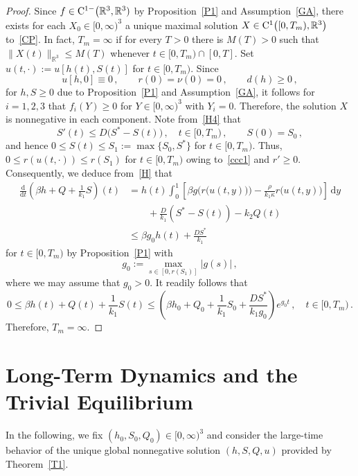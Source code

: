 \documentclass[reqno,11pt]{amsart}
\numberwithin{equation}{section}
\newcommand{\R}{\mathbb{R}}
\newcommand{\rd}{\mathrm{d}}
\begin{document}
\begin{proof} 
 Since \mbox{$f\in {\rm C}^{1-}\big(\R^3,\R^3)$} by Proposition~\ref{P1} and Assumption~\eqref{GA}, there exists for each $X_0\in [0,\infty)^3$  a unique maximal solution $X\in {\rm C}^1\bigl([0,T_m),\R^3\bigr)$ to~\eqref{CP}. In fact,  \mbox{$T_m=\infty$} if for every $T>0$ there is $M(T)>0$ such that  $\|X(t)\|_{\R^3}\le M(T)$ whenever $t\in [0,T_m)\cap [0,T]$. Set $u(t,\cdot):=u[h(t),S(t)]$ for $t\in [0,T_m)$. Since 
$$u[h,0]\equiv 0\,,\qquad r(0)=\nu(0)=0\,,\qquad d(h)\ge 0\,,$$ 
for $h,S\ge 0$ due to Proposition~\ref{P1} and Assumption~\eqref{GA}, it follows for $i=1,2,3$ that $f_i(Y)\ge 0$ for $Y\in [0,\infty)^3$ with $Y_i=0$. Therefore, the solution $X$ is nonnegative in each component. 
Note from~\eqref{H4} that
$$
S'(t)\le D\big(S^*-S(t)\big)\,,\quad t\in [0,T_m)\,,\qquad S(0)=S_0\,,
$$
and hence $0\le S(t)\le S_1:=\max\{S_0,S^*\}$ for $t\in [0,T_m)$. Thus, $0\le r(u(t,\cdot))\le r(S_1)$ for $t\in [0,T_m)$ owing to~\eqref{ccc1} and $r'\ge 0$. Consequently, we deduce from~\eqref{H} that
\begin{align}
\frac{\rd}{\rd t}\left(\beta h+Q+\frac{1}{k_1}S\right)(t)&=h(t)\int_0^1 \left[\beta g\bigl(r\bigl(u(t,y)\bigr)\bigr)-\frac{\rho }{k_1\kappa }  r\bigl(u(t,y)\bigr)\right]\,\rd y\nonumber\\
&\qquad+ \frac{D}{k_1}(S^*-S(t))-k_2Q(t)\label{est}\\
&\le \beta g_0 h(t) + \frac{DS^*}{k_1}\nonumber
\end{align}
for $t\in [0,T_m)$ by Proposition~\ref{P1} with 
$$
g_0:=\max_{s\in [0,r(S_1)]} \vert g(s)\vert \,,
$$
where we may assume that $g_0>0$. It readily follows that
$$
0\le \beta h(t)+Q(t)+\frac{1}{k_1}S(t)\le \left(\beta h_0+Q_0+\frac{1}{k_1}S_0+\frac{DS^*}{k_1 g_0}\right)e^{ g_0 t}\,,\quad t\in [0,T_m)\,.
$$
Therefore, $T_m=\infty$.
\end{proof}



\section{Long-Term Dynamics and the Trivial Equilibrium}\label{Sec3}

In the following, we fix $(h_0,S_0,Q_0)\in [0,\infty)^3$ and consider the large-time behavior of the unique global nonnegative solution  $(h,S,Q,u)$ provided by Theorem~\ref{T1}.\\
\end{document}
